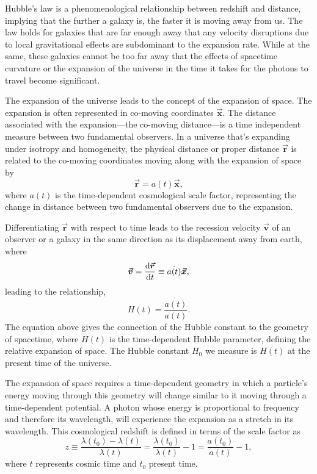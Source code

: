 Hubble's law is a phenomenological relationship between redshift and distance, implying that the further a galaxy is, the faster it is moving away from us. The law holds for galaxies that are far enough away that any velocity disruptions due to local gravitational effects are subdominant to the expansion rate. While at the same, these galaxies cannot be too far away that the effects of spacetime curvature or the expansion of the universe in the time it takes for the photons to travel become significant. 

The expansion of the universe leads to the concept of the expansion of space. The expansion is often represented in co-moving coordinates $\boldsymbol{\vec{x}}$. The distance associated with the expansion---the co-moving distance---is a time independent measure between two fundamental observers. In a universe that's expanding under isotropy and homogeneity, the physical distance or proper distance $\boldsymbol{\vec{r}}$ is related to the co-moving coordinates moving along with the expansion of space by
%
\begin{equation}
  \boldsymbol{\vec{r}} = a(t)\boldsymbol{\vec{x}},
\end{equation}
%
where $a(t)$ is the time-dependent cosmological scale factor, representing the change in distance between two fundamental observers due to the expansion.

Differentiating $\boldsymbol{\vec{r}}$ with respect to time leads to the recession velocity $\boldsymbol{\vec{v}}$ of an observer or a galaxy in the same direction as its displacement away from earth, where
%
\begin{equation}
  \boldsymbol{\vec{v}} = \dv{\boldsymbol{\vec{r}}}{t} \equiv  \dot{a(t)}\boldsymbol{\vec{x}},
\end{equation}
%
leading to the relationship,
%
\begin{equation}
  H(t) = \frac{\dot{a(t)}}{a(t)}.
\end{equation}
%
The equation above gives the connection of the Hubble constant to the geometry of spacetime, where $H(t)$ is the time-dependent Hubble parameter, defining the relative expansion of space. The Hubble constant $H_0$ we measure is $H(t)$ at the present time of the universe.

The expansion of space requires a time-dependent geometry in which a particle's energy moving through this geometry will change similar to it moving through a time-dependent potential. A photon whose energy is proportional to frequency and therefore its wavelength, will experience the expansion as a stretch in its wavelength. This cosmological redshift is defined in terms of the scale factor as
%
\begin{equation}
  z \equiv \frac{\lambda(t_0) - \lambda(t)}{\lambda(t)} = \frac{\lambda(t_0)}{\lambda(t)} -1 = \frac{a(t_0)}{a(t)} - 1,
\end{equation}
%
where $t$ represents cosmic time and $t_0$ present time.

